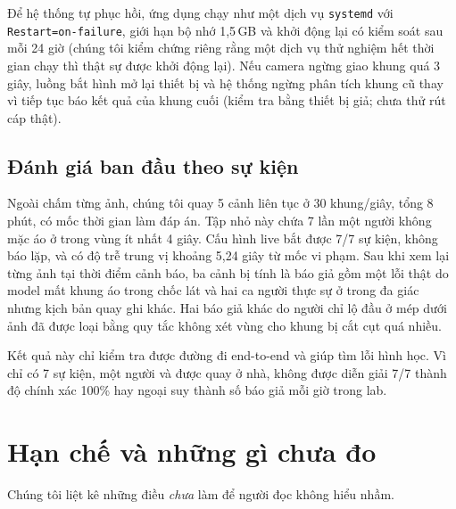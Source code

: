 \documentclass[12pt,a4paper]{article}
\begin{document}
Để hệ thống tự phục hồi, ứng dụng chạy như một dịch vụ \texttt{systemd} với \texttt{Restart=on-failure}, giới hạn bộ nhớ 1,5\,GB và khởi động lại có kiểm soát sau mỗi 24 giờ
(chúng tôi kiểm chứng riêng rằng một dịch vụ thử nghiệm hết thời gian chạy thì thật sự được khởi động lại). Nếu camera ngừng giao khung quá 3 giây, luồng bắt hình mở lại
thiết bị và hệ thống ngừng phân tích khung cũ thay vì tiếp tục báo kết quả của khung cuối (kiểm tra bằng thiết bị giả; chưa thử rút cáp thật).

\subsection{Đánh giá ban đầu theo sự kiện}

Ngoài chấm từng ảnh, chúng tôi quay 5 cảnh liên tục ở 30 khung/giây, tổng 8 phút, có mốc thời gian làm đáp án. Tập nhỏ
này chứa 7 lần một người không mặc áo ở trong vùng ít nhất 4 giây. Cấu hình live bắt được 7/7 sự kiện, không báo lặp,
và có độ trễ trung vị khoảng 5,24 giây từ mốc vi phạm. Sau khi xem lại từng ảnh tại thời điểm cảnh báo, ba cảnh bị tính
là báo giả gồm một lỗi thật do model mất khung áo trong chốc lát và hai ca người thực sự ở trong đa giác nhưng kịch bản
quay ghi khác. Hai báo giả khác do người chỉ lộ đầu ở mép dưới ảnh đã được loại bằng quy tắc không xét vùng cho khung
bị cắt cụt quá nhiều.

Kết quả này chỉ kiểm tra được đường đi end-to-end và giúp tìm lỗi hình học. Vì chỉ có 7 sự kiện, một người và được quay
ở nhà, không được diễn giải 7/7 thành độ chính xác 100\% hay ngoại suy thành số báo giả mỗi giờ trong lab.

\section{Hạn chế và những gì chưa đo}
\label{sec:limits}

Chúng tôi liệt kê những điều \emph{chưa} làm để người đọc không hiểu nhầm.
\end{document}

